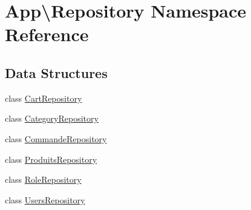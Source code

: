 \hypertarget{namespace_app_1_1_repository}{}\section{App\textbackslash{}Repository Namespace Reference}
\label{namespace_app_1_1_repository}
\subsection*{Data Structures}
\begin{DoxyCompactItemize}
\item 
class \mbox{\hyperlink{class_app_1_1_repository_1_1_cart_repository}{Cart\+Repository}}
\item 
class \mbox{\hyperlink{class_app_1_1_repository_1_1_category_repository}{Category\+Repository}}
\item 
class \mbox{\hyperlink{class_app_1_1_repository_1_1_commande_repository}{Commande\+Repository}}
\item 
class \mbox{\hyperlink{class_app_1_1_repository_1_1_produits_repository}{Produits\+Repository}}
\item 
class \mbox{\hyperlink{class_app_1_1_repository_1_1_role_repository}{Role\+Repository}}
\item 
class \mbox{\hyperlink{class_app_1_1_repository_1_1_users_repository}{Users\+Repository}}
\end{DoxyCompactItemize}
